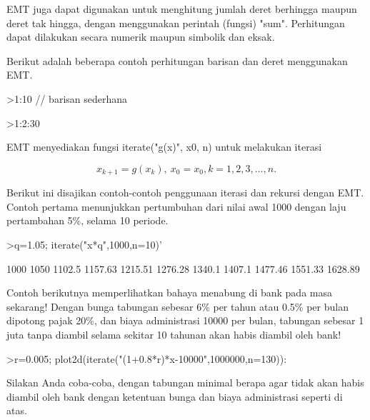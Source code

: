 \documentclass[a4paper,10pt]{article}
\begin{document}
\begin{eulernotebook}
\begin{eulercomment}
\begin{eulercomment}
\begin{eulercomment}
\begin{eulercomment}
\begin{eulercomment}
EMT juga dapat digunakan untuk menghitung jumlah deret berhingga maupun deret tak hingga,
dengan menggunakan perintah (fungsi) "sum". Perhitungan dapat dilakukan secara numerik
maupun simbolik dan eksak.

Berikut adalah beberapa contoh perhitungan barisan dan deret menggunakan EMT.
\end{eulercomment}
\begin{eulerprompt}
>1:10 // barisan sederhana
\end{eulerprompt}
\begin{euleroutput}
  [1,  2,  3,  4,  5,  6,  7,  8,  9,  10]
\end{euleroutput}
\begin{eulerprompt}
>1:2:30
\end{eulerprompt}
\begin{euleroutput}
  [1,  3,  5,  7,  9,  11,  13,  15,  17,  19,  21,  23,  25,  27,  29]
\end{euleroutput}
\begin{eulercomment}
EMT menyediakan fungsi iterate("g(x)", x0, n) untuk melakukan iterasi

\end{eulercomment}
\begin{eulerformula}
\[
x_{k+1}=g(x_k), \ x_0=x_0, k= 1, 2, 3, ..., n.
\]
\end{eulerformula}
\begin{eulercomment}
Berikut ini disajikan contoh-contoh penggunaan iterasi dan rekursi dengan EMT. Contoh
pertama menunjukkan pertumbuhan dari nilai awal 1000 dengan laju pertambahan 5\%, selama 10
periode.
\end{eulercomment}
\begin{eulerprompt}
>q=1.05; iterate("x*q",1000,n=10)'
\end{eulerprompt}
\begin{euleroutput}
           1000 
           1050 
         1102.5 
        1157.63 
        1215.51 
        1276.28 
         1340.1 
         1407.1 
        1477.46 
        1551.33 
        1628.89 
\end{euleroutput}
\begin{eulercomment}
Contoh berikutnya memperlihatkan bahaya menabung di bank pada masa sekarang! Dengan bunga
tabungan sebesar 6\% per tahun atau 0.5\% per bulan dipotong pajak 20\%, dan biaya administrasi
10000 per bulan, tabungan sebesar 1 juta tanpa diambil selama sekitar 10 tahunan akan habis
diambil oleh bank!
\end{eulercomment}
\begin{eulerprompt}
>r=0.005; plot2d(iterate("(1+0.8*r)*x-10000",1000000,n=130)):
\end{eulerprompt}
\begin{eulercomment}
Silakan Anda coba-coba, dengan tabungan minimal berapa agar tidak akan habis diambil oleh
bank dengan ketentuan bunga dan biaya administrasi seperti di atas.


\end{eulercomment}
\end{eulercomment}
\end{eulercomment}
\end{eulercomment}
\end{eulercomment}
\end{eulernotebook}
\end{document}
